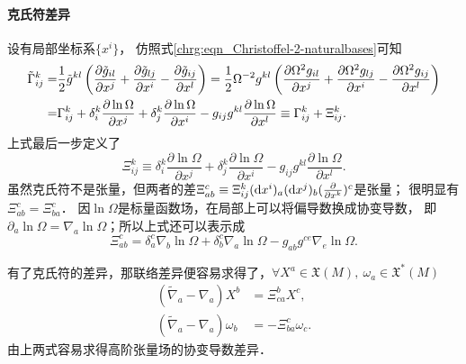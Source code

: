 \paragraph{克氏符差异}
设有局部坐标系$\{x^i\}$，
仿照式\eqref{chrg:eqn_Christoffel-2-naturalbases}可知
\begin{align}
    \tilde{\Gamma}_{ij}^k =& \frac{1}{2} \tilde{g}^{kl} \left( \frac{\partial \tilde{g}_{il}  }{\partial x^j}
        + \frac{\partial \tilde{g}_{lj} } {\partial x^i}  - \frac{\partial \tilde{g}_{ij}} {\partial x^l} \right)
        =\frac{1}{2} \Omega^{-2}{g}^{kl} \left( \frac{\partial \Omega^{2}{g}_{il}  }{\partial x^j}
        + \frac{\partial \Omega^{2}{g}_{lj} } {\partial x^i}  
        - \frac{\partial \Omega^{2}{g}_{ij}} {\partial x^l} \right) \notag \\
      =&\Gamma_{ij}^k+ \delta_i^k \frac{\partial \ln \Omega  }{\partial x^j}
      + \delta_j^k \frac{\partial \ln\Omega} {\partial x^i}
      - {g}_{ij} {g}^{kl}\frac{\partial \ln\Omega} {\partial x^l}
      \equiv \Gamma_{ij}^k+ \Xi_{ij}^k. \label{chrg:eqn_comformal-Gamma}
\end{align}
上式最后一步定义了
\begin{equation}\label{chrg:eqn_comformal-Xi}
    \Xi_{ij}^k \equiv \delta_i^k \frac{\partial \ln \Omega  }{\partial x^j}
    + \delta_j^k \frac{\partial \ln\Omega} {\partial x^i}
    - {g}_{ij} {g}^{kl}\frac{\partial \ln\Omega} {\partial x^l} .
\end{equation}
虽然克氏符不是张量，但两者的差$\Xi_{ab}^c\equiv \Xi_{ij}^k ({\rm d}x^i)_a ({\rm d}x^j)_b
(\frac{\partial}{\partial x^k} )^c$是张量；
很明显有$\Xi_{ab}^c=\Xi_{ba}^c$．
因$\ln \Omega$是标量函数场，在局部上可以将偏导数换成协变导数，
即$\partial_a \ln \Omega = \nabla_a\ln \Omega$；所以上式还可以表示成
\begin{equation}\label{chrg:eqn_comformal-Xi-nabla}
    \Xi_{ab}^c = \delta_a^c \nabla_b\ln \Omega + \delta_b^c \nabla_a\ln \Omega
    - {g}_{ab} {g}^{ce}\nabla_e\ln \Omega .
\end{equation}

有了克氏符的差异，那联络差异便容易求得了，$\forall X^a\in \mathfrak{X}(M),\ \omega_a \in \mathfrak{X}^*(M)$
\begin{align}
    (\tilde{\nabla}_a-\nabla_a) X^b & = \Xi_{ca}^b X^c,    \label{chrg:eqn_comformal-X-D} \\
    (\tilde{\nabla}_a-\nabla_a) \omega_b & = -\Xi_{ba}^c \omega_c.    \label{chrg:eqn_comformal-w-D}
\end{align}
由上两式容易求得高阶张量场的协变导数差异．





